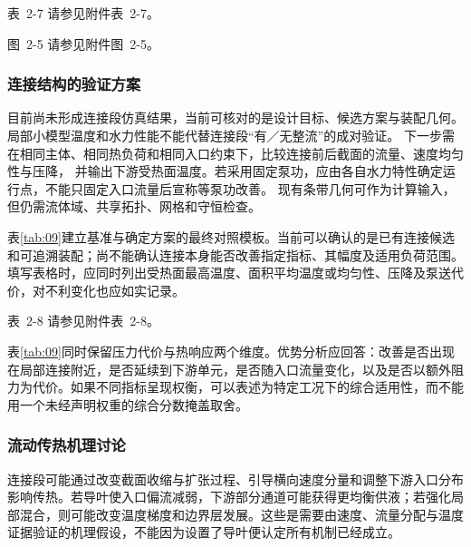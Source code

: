 \documentclass[UTF8]{midterm}
\makeatletter
\newcommand{\submissionnumber}[1]{\def\@currentlabel{#1}}
\makeatother
\begin{document}
\par\noindent \begingroup\submissionnumber{2-7}\label{tab:08}\endgroup 表~2-7 请参见附件表~2-7。\par




\par\noindent \begingroup\submissionnumber{2-5}\label{fig:13}\endgroup 图~2-5 请参见附件图~2-5。\par



\subsubsection{连接结构的验证方案}

目前尚未形成连接段仿真结果，当前可核对的是设计目标、候选方案与装配几何。
局部小模型温度和水力性能不能代替连接段“有／无整流”的成对验证。
下一步需在相同主体、相同热负荷和相同入口约束下，比较连接前后截面的流量、速度均匀性与压降，
并输出下游受热面温度。若采用固定泵功，应由各自水力特性确定运行点，不能只固定入口流量后宣称等泵功改善。
现有条带几何可作为计算输入，但仍需流体域、共享拓扑、网格和守恒检查\cite{stagereports}。


表\ref{tab:09}建立基准与确定方案的最终对照模板。当前可以确认的是已有连接候选和可追溯装配；尚不能确认连接本身能否改善指定指标、其幅度及适用负荷范围。填写表格时，应同时列出受热面最高温度、面积平均温度或均匀性、压降及泵送代价，对不利变化也应如实记录。

\par\noindent \begingroup\submissionnumber{2-8}\label{tab:09}\endgroup 表~2-8 请参见附件表~2-8。\par




表\ref{tab:09}同时保留压力代价与热响应两个维度。优势分析应回答：改善是否出现在局部连接附近，是否延续到下游单元，是否随入口流量变化，以及是否以额外阻力为代价。如果不同指标呈现权衡，可以表述为特定工况下的综合适用性，而不能用一个未经声明权重的综合分数掩盖取舍。

\subsubsection{流动传热机理讨论}
连接段可能通过改变截面收缩与扩张过程、引导横向速度分量和调整下游入口分布影响传热。若导叶使入口偏流减弱，下游部分通道可能获得更均衡供液；若强化局部混合，则可能改变温度梯度和边界层发展。这些是需要由速度、流量分配与温度证据验证的机理假设，不能因为设置了导叶便认定所有机制已经成立。
\end{document}
